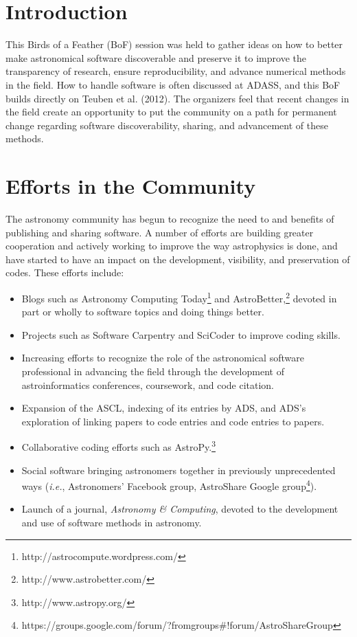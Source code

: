 \documentclass[11pt,twoside]{article}
\begin{document}
\section{Introduction}

This Birds of a Feather (BoF) session was held to gather ideas on how to better make astronomical software discoverable and preserve it to improve the transparency of research, ensure reproducibility, and advance numerical methods in the field. How to handle software is often discussed at ADASS, and this BoF builds directly on Teuben et al. (2012). The organizers feel that recent changes in the field create an opportunity to put the community on a path for permanent change regarding software discoverability, sharing, and advancement of these methods.

\section{Efforts in the Community}

The astronomy community has begun to recognize the need to and benefits of publishing and sharing software. A number of efforts are building greater cooperation and actively working to improve the way astrophysics is done, and have started to have an impact on the development, visibility, and preservation of codes. These efforts include:

\begin{itemize}
\item Blogs such as Astronomy Computing Today\footnote{http://astrocompute.wordpress.com/} and AstroBetter,\footnote{http://www.astrobetter.com/} devoted in part or wholly to software topics and doing things better.
\item Projects such as Software Carpentry and SciCoder to improve coding skills.
\item Increasing efforts to recognize the role of the astronomical software professional in advancing the field through the development of astroinformatics conferences, coursework, and code citation.
\item Expansion of the ASCL, indexing of its entries by ADS, and ADS's exploration of linking papers to code entries and code entries to papers.
\item Collaborative coding efforts such as AstroPy.\footnote{http://www.astropy.org/}
\item Social software bringing astronomers together in previously unprecedented ways ({\em i.e.}, Astronomers' Facebook group, AstroShare Google group\footnote{https://groups.google.com/forum/?fromgroups\#!forum/AstroShareGroup}).
\item Launch of a journal, {\em Astronomy \& Computing}, devoted to the development and use of software methods in astronomy.
\end{itemize}
\end{document}
